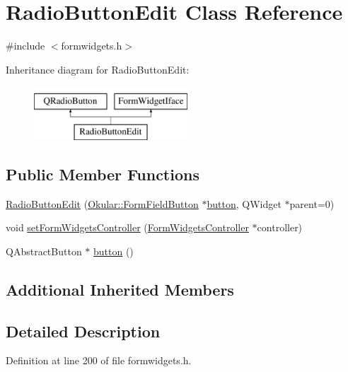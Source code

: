 \hypertarget{classRadioButtonEdit}{\section{Radio\+Button\+Edit Class Reference}
\label{classRadioButtonEdit}
}


{\ttfamily \#include $<$formwidgets.\+h$>$}

Inheritance diagram for Radio\+Button\+Edit\+:\begin{figure}[H]
\begin{center}
\leavevmode
\includegraphics[height=2.000000cm]{classRadioButtonEdit}
\end{center}
\end{figure}
\subsection*{Public Member Functions}
\begin{DoxyCompactItemize}
\item 
\hyperlink{classRadioButtonEdit_a4784a74ee62dd06a8b0afe62f3788b66}{Radio\+Button\+Edit} (\hyperlink{classOkular_1_1FormFieldButton}{Okular\+::\+Form\+Field\+Button} $\ast$\hyperlink{classRadioButtonEdit_aade78546b2156a0dd26fbec06e772d93}{button}, Q\+Widget $\ast$parent=0)
\item 
void \hyperlink{classRadioButtonEdit_a1f088cf2d034c54f17dec99fad143530}{set\+Form\+Widgets\+Controller} (\hyperlink{classFormWidgetsController}{Form\+Widgets\+Controller} $\ast$controller)
\item 
Q\+Abstract\+Button $\ast$ \hyperlink{classRadioButtonEdit_aade78546b2156a0dd26fbec06e772d93}{button} ()
\end{DoxyCompactItemize}
\subsection*{Additional Inherited Members}


\subsection{Detailed Description}


Definition at line 200 of file formwidgets.\+h.



